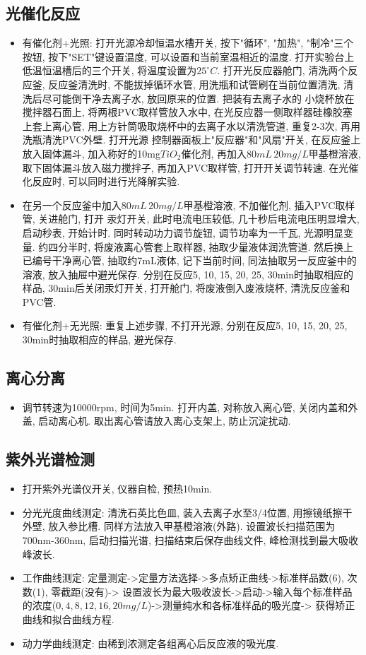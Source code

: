 \documentclass[a4paper]{article}
\begin{document}
\subsection{光催化反应}
\begin{itemize}
	\item 有催化剂+光照: 打开光源冷却恒温水槽开关, 按下"循环", "加热", "制冷"三个按钮, 
	按下"SET"键设置温度, 可以设置和当前室温相近的温度. 打开实验台上低温恒温槽后的三个开关, 
	将温度设置为$25^\circ C$. 打开光反应器舱门, 清洗两个反应釜, 反应釜清洗时, 不能拔掉循环水管, 
	用洗瓶和试管刷在当前位置清洗, 清洗后尽可能倒干净去离子水, 放回原来的位置. 把装有去离子水的
	小烧杯放在搅拌器石面上, 将两根PVC取样管放入水中, 在光反应器一侧取样器硅橡胶塞上套上离心管,
	用上方针筒吸取烧杯中的去离子水以清洗管道, 重复2-3次, 再用洗瓶清洗PVC外壁. 打开光源
	控制器面板上"反应器"和"风扇"开关, 在反应釜上放入固体漏斗, 加入称好的10mg$TiO_{2}$催化剂, 
	再加入$80mL\,20mg/L$甲基橙溶液, 取下固体漏斗放入磁力搅拌子, 再加入PVC取样管, 打开开关调节转速.
	在光催化反应时, 可以同时进行光降解实验.
	\item 在另一个反应釜中加入$80mL\,20mg/L$甲基橙溶液, 不加催化剂, 插入PVC取样管, 关进舱门, 打开
	汞灯开关, 此时电流电压较低, 几十秒后电流电压明显增大, 启动秒表, 开始计时. 同时转动功力调节旋钮, 
	调节功率为一千瓦, 光源明显变量. 约四分半时, 将废液离心管套上取样器, 抽取少量液体润洗管道. 
	然后换上已编号干净离心管, 抽取约7mL液体, 记下当前时间, 同法抽取另一反应釜中的溶液, 
	放入抽屉中避光保存. 分别在反应5, 10, 15, 20, 25, 30min时抽取相应的样品, 30min后关闭汞灯开关, 
	打开舱门, 将废液倒入废液烧杯, 清洗反应釜和PVC管.
	\item 有催化剂+无光照: 重复上述步骤, 不打开光源, 
	分别在反应5, 10, 15, 20, 25, 30min时抽取相应的样品, 避光保存.
\end{itemize}
\subsection{离心分离}
\begin{itemize}
	\item 调节转速为10000rpm, 时间为5min. 打开内盖, 对称放入离心管, 关闭内盖和外盖, 启动离心机.
	取出离心管请放入离心支架上, 防止沉淀扰动.
\end{itemize}
\subsection{紫外光谱检测}
\begin{itemize}
	\item 打开紫外光谱仪开关, 仪器自检, 预热10min.
	\item 分光光度曲线测定: 清洗石英比色皿, 装入去离子水至3/4位置, 用擦镜纸擦干外壁, 放入参比槽.
	同样方法放入甲基橙溶液(外路). 设置波长扫描范围为700nm-360nm, 启动扫描光谱, 扫描结束后保存曲线文件, 
	峰检测找到最大吸收峰波长.
	\item 工作曲线测定: 定量测定->定量方法选择->多点矫正曲线->标准样品数(6), 次数(1), 零截距(没有)->
	设置波长为最大吸收波长->启动->输入每个标准样品的浓度($0, 4, 8, 12, 16, 20mg/L$)->测量纯水和各标准样品的吸光度->
	获得矫正曲线和拟合曲线方程.
	\item 动力学曲线测定: 由稀到浓测定各组离心后反应液的吸光度.
\end{itemize}
\end{document}
